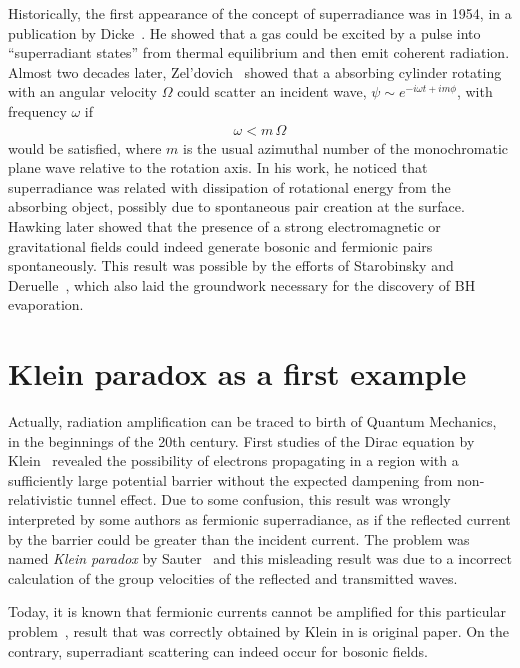 Historically, the first appearance of the concept of superradiance was in 1954, in a publication by Dicke~\cite{Dicke1954}.
He showed that a gas could be excited by a pulse into ``superradiant states'' from thermal equilibrium and then emit coherent radiation.
Almost two decades later, Zel'dovich~\cite{Zeldovich1971,Zeldovich1972} showed that a absorbing cylinder rotating with an angular velocity $\Omega$ could scatter an incident wave, $\psi \sim e^{-i \omega t + i m \phi}$, with frequency $\omega$ if
\begin{align}
    \omega < m\, \Omega
    \label{eq1:superradiance}
\end{align}
would be satisfied, where $m$ is the usual azimuthal number of the monochromatic plane wave relative to the rotation axis.
In his work, he noticed that superradiance was related with dissipation of rotational energy from the absorbing object, possibly due to spontaneous pair creation at the surface. 
Hawking later showed that the presence of a strong electromagnetic or gravitational fields could indeed generate bosonic and fermionic pairs spontaneously.
This result was possible by the efforts of Starobinsky and Deruelle~\cite{Starobinsky1973a,Starobinsky1973b,Deruelle1974,Deruelle1975}, which also laid the groundwork necessary for the discovery of BH evaporation.


\section{Klein paradox as a first example}

Actually, radiation amplification can be traced to birth of Quantum Mechanics, in the beginnings of the 20th century. 
First studies of the Dirac equation by Klein~\cite{Klein1929} revealed the possibility of electrons propagating in a region with a sufficiently large potential barrier without the expected dampening from non-relativistic tunnel effect.
Due to some confusion, this result was wrongly interpreted by some authors as fermionic superradiance, as if the reflected current by the barrier could be greater than the incident current. 
The problem was named \emph{Klein paradox} by Sauter~\cite{Sauter1931} and this misleading result was due to a incorrect calculation of the group velocities of the reflected and transmitted waves. 

Today, it is known that fermionic currents cannot be amplified for this particular problem~\cite{Manogue1988,Klein1929}, result that was correctly obtained by Klein in is original paper. 
On the contrary, superradiant scattering can indeed occur for bosonic fields.

